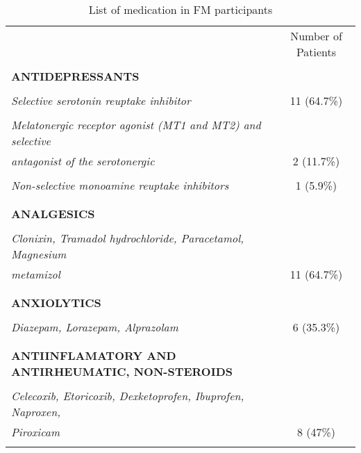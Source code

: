 \begin{table}[ht]
\caption{List of medication in FM participants}
\begin{tabular}{lc}
	\hline 
	& Number of Patients  \\ \\ \hline
 \textbf{ANTIDEPRESSANTS}  & \\ \\
    \emph{Selective serotonin reuptake inhibitor}  & 11 (64.7\%)  \\ \\ 
    
    \emph{Melatonergic receptor agonist (MT1 and MT2) and selective }  &   \\ 
\hspace{1.0cm} \emph{antagonist of the serotonergic}  & 2 (11.7\%)  \\ \\

    \emph{Non-selective monoamine reuptake inhibitors}  &   1 (5.9\%)  \\ \\ \\

   \textbf{ANALGESICS}  & \\ \\
    \emph{Clonixin, Tramadol hydrochloride, Paracetamol, Magnesium}  & \\ 
    \hspace{1.0cm} \emph{metamizol}  & 11 (64.7\%)  \\ \\ \\

    \textbf{ANXIOLYTICS}  & \\ \\
    \emph{Diazepam, Lorazepam, Alprazolam}  & 6 (35.3\%)  \\ \\ \\

   \textbf{ANTIINFLAMATORY AND ANTIRHEUMATIC, NON-STEROIDS}  & \\ \\
    \emph{Celecoxib, Etoricoxib, Dexketoprofen, Ibuprofen, Naproxen,}  & \\ 
    \hspace{1.0cm} \emph{Piroxicam}  & 8 (47\%) \\ \\
    \hline
\end{tabular}
\label{tab:medication}
\end{table}